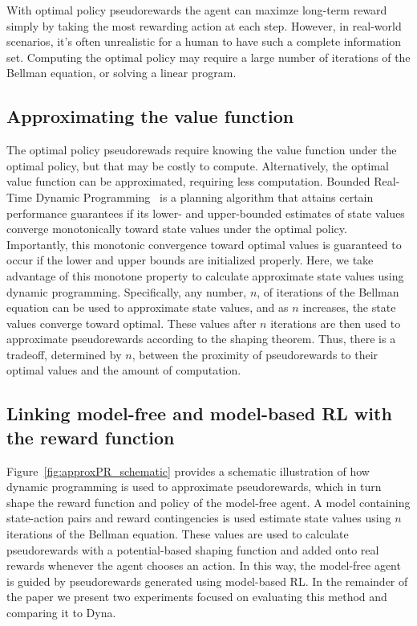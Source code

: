 \documentclass[letterpaper]{article}
\begin{document}
With optimal policy pseudorewards the agent can maximze long-term reward simply by taking the most rewarding action at each step. However, in real-world scenarios, it's often unrealistic for a human to have such a complete information set. Computing the optimal policy may require a large number of iterations of the Bellman equation, or solving a linear program.

\subsection{Approximating the value function}

The optimal policy pseudorewads require knowing the value function under the optimal policy, but that may be costly to compute. Alternatively, the optimal value function can be approximated, requiring less computation. Bounded Real-Time Dynamic Programming~\cite{mcmahan2005bounded} is a planning algorithm that attains certain performance guarantees if its lower- and upper-bounded estimates of state values converge monotonically toward state values under the optimal policy. Importantly, this monotonic convergence toward optimal values is guaranteed to occur if the lower and upper bounds are initialized properly. Here, we take advantage of this monotone property to calculate approximate state values using dynamic programming.  Specifically, any number, $n$, of iterations of the Bellman equation can be used to approximate state values, and as $n$ increases, the state values converge toward optimal. These values after $n$ iterations are then used to approximate pseudorewards according to the shaping theorem. Thus, there is a tradeoff, determined by $n$, between  the proximity of pseudorewards to their optimal values and the amount of computation.

\subsection{Linking model-free and model-based RL with the reward function}

Figure~\ref{fig:approxPR_schematic} provides a schematic illustration of how dynamic programming is used to approximate pseudorewards, which in turn shape the reward function and policy of the model-free agent. A model containing state-action pairs and reward contingencies is used estimate state values using $n$ iterations of the Bellman equation. These values are used to calculate pseudorewards with a potential-based shaping function and added onto real rewards whenever the agent chooses an action. In this way, the model-free agent is guided by pseudorewards generated using model-based RL. In the remainder of the paper we present two experiments focused on evaluating this method and comparing it to Dyna.
\end{document}

